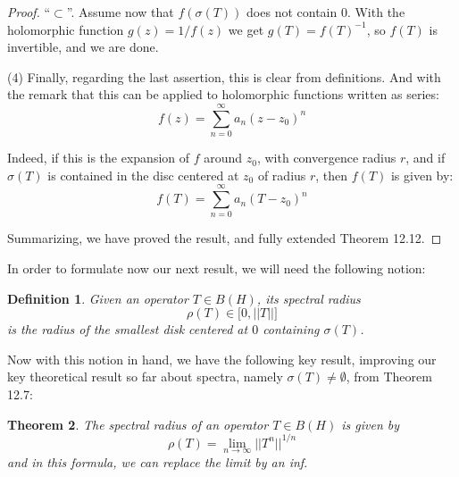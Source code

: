 \documentclass[12pt]{amsbook}
\newtheorem{theorem}{Theorem}[chapter]
\newtheorem{definition}[theorem]{Definition}
\begin{document}
\begin{proof}
\medskip

``$\subset$''. Assume now that $f(\sigma(T))$ does not contain $0$. With the holomorphic function $g(z)=1/f(z)$ we get $g(T)=f(T)^{-1}$, so $f(T)$ is invertible, and we are done.

\medskip

(4) Finally, regarding the last assertion, this is clear from definitions. And with the remark that this can be applied to holomorphic functions written as series:
$$f(z)=\sum_{n=0}^\infty a_n(z-z_0)^n$$

Indeed, if this is the expansion of $f$ around $z_0$, with convergence radius $r$, and if $\sigma(T)$ is contained in the disc centered at $z_0$ of radius $r$, then $f(T)$ is given by:
$$f(T)=\sum_{n=0}^\infty a_n(T-z_0)^n$$

Summarizing, we have proved the result, and fully extended Theorem 12.12.
\end{proof}

In order to formulate now our next result, we will need the following notion:


\begin{definition}
Given an operator $T\in B(H)$, its spectral radius 
$$\rho(T)\in\big[0,||T||\big]$$
is the radius of the smallest disk centered at $0$ containing $\sigma(T)$. 
\end{definition}

Now with this notion in hand, we have the following key result, improving our key theoretical result so far about spectra, namely $\sigma(T)\neq\emptyset$, from Theorem 12.7:

\begin{theorem}
The spectral radius of an operator $T\in B(H)$ is given by
$$\rho(T)=\lim_{n\to\infty}||T^n||^{1/n}$$
and in this formula, we can replace the limit by an inf.
\end{theorem}
\end{document}
